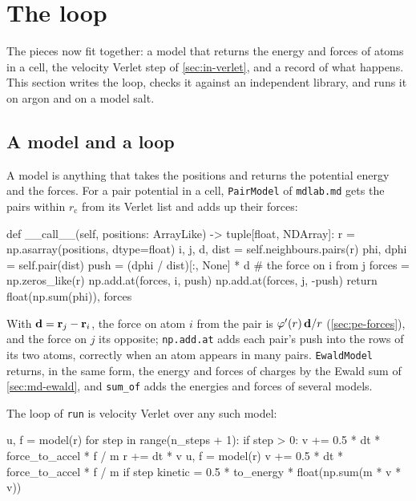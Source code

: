 \section{The loop}
\label{sec:md-loop}

The pieces now fit together: a model that returns the energy and forces
of atoms in a cell, the velocity Verlet step of \cref{sec:in-verlet}, and
a record of what happens. This section writes the loop, checks it against
an independent library, and runs it on argon and on a model salt.

\subsection*{A model and a loop}

A model is anything that takes the positions and returns the potential
energy and the forces. For a pair potential in a cell, \texttt{PairModel}
of \texttt{mdlab.md} gets the pairs within $r_{\mathrm c}$ from its Verlet
list and adds up their forces:

\begin{code}
    def __call__(self, positions: ArrayLike) -> tuple[float, NDArray]:
        r = np.asarray(positions, dtype=float)
        i, j, d, dist = self.neighbours.pairs(r)
        phi, dphi = self.pair(dist)
        push = (dphi / dist)[:, None] * d  # the force on i from j
        forces = np.zeros_like(r)
        np.add.at(forces, i, push)
        np.add.at(forces, j, -push)
        return float(np.sum(phi)), forces
\end{code}

\noindent With $\bm{\mathrm{d}} = \bm{\mathrm{r}}_j - \bm{\mathrm{r}}_i$, the force on atom $i$ from
the pair is $\varphi'(r)\,\bm{\mathrm{d}}/r$ (\cref{sec:pe-forces}), and the force on
$j$ its opposite; \texttt{np.add.at} adds each pair's push into the rows
of its two atoms, correctly when an atom appears in many pairs.
\texttt{EwaldModel} returns, in the same form, the energy and forces of
charges by the Ewald sum of \cref{sec:md-ewald}, and \texttt{sum\_of}
adds the energies and forces of several models.

The loop of \texttt{run} is velocity Verlet over any such model:

\begin{code}
    u, f = model(r)
    for step in range(n_steps + 1):
        if step > 0:
            v += 0.5 * dt * force_to_accel * f / m
            r += dt * v
            u, f = model(r)
            v += 0.5 * dt * force_to_accel * f / m
        if step %
            kinetic = 0.5 * to_energy * float(np.sum(m * v * v))
\end{code}

